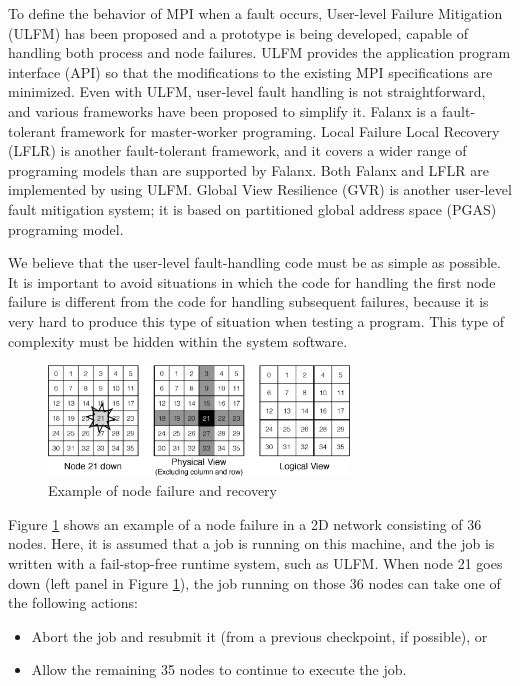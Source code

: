 \documentclass[Afour,times,sagev]{sagej}
\begin{document}
To define the behavior of MPI when a fault occurs, User-level Failure
Mitigation (ULFM) has been proposed and a prototype is being
developed, capable of handling both process and node
failures\citep{Bland01082013}. ULFM provides the application program
interface (API) so that the modifications to the existing MPI
specifications are minimized. Even with ULFM, user-level fault
handling is not straightforward, and various frameworks have been
proposed to simplify it. Falanx is a fault-tolerant framework for
master-worker programing\citep{falanx}. Local Failure Local Recovery
(LFLR) is another fault-tolerant
framework\citep{Teranishi:2014:TLF:2642769.2642774}, and it covers a
wider range of programing models than are supported by Falanx. Both
Falanx and LFLR are implemented by using ULFM. Global View Resilience
(GVR) is another user-level fault mitigation system; it is based on
partitioned global address space (PGAS)
programing model\citep{gvr-sc14,GVR-vecpar2014}.

We believe that the user-level fault-handling code must be as simple
as possible. It is important to avoid situations in which the code for
handling the first node failure is different from the code for
handling subsequent failures, because it is very hard to produce this
type of situation when testing a program. This type of complexity must
be hidden within the system software.

\begin{figure}[ht]
\centering
\includegraphics[width=80mm]{Figs/NodeFailure.eps}
  \caption{Example of node failure and recovery}
  \label{fig:node-failure}
\end{figure}

Figure \ref{fig:node-failure} shows an example of a node failure in a
2D network consisting of 36 nodes. Here, it is assumed that a job is
running on this machine, and the job is written with a fail-stop-free
runtime system, such as ULFM. When node 21 goes down (left panel in
Figure \ref{fig:node-failure}), the job running on those 36 nodes can
take one of the following actions:

\begin{itemize}
\item Abort the job and resubmit it (from a previous
  checkpoint, if possible), or
\item Allow the remaining 35 nodes to continue to execute the job.
\end{itemize}
\end{document}
